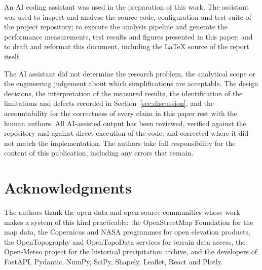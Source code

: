 \documentclass[sigconf,review,10pt]{acmart}
\begin{document}
An AI coding assistant was used in the preparation of this work. The
assistant was used to inspect and analyse the source code, configuration
and test suite of the project repository; to execute the analysis pipeline
and generate the performance measurements, test results and figures
presented in this paper; and to draft and reformat this document,
including the LaTeX source of the report itself.

The AI assistant did not determine the research problem, the analytical
scope or the engineering judgement about which simplifications are
acceptable. The design decisions, the interpretation of the measured
results, the identification of the limitations and defects recorded in
Section~\ref{sec:discussion}, and the accountability for the correctness
of every claim in this paper rest with the human authors. All
AI-assisted output has been reviewed, verified against the repository and
against direct execution of the code, and corrected where it did not
match the implementation. The authors take full responsibility for the
content of this publication, including any errors that remain.

\section*{Acknowledgments}

The authors thank the open data and open source communities whose work
makes a system of this kind practicable: the OpenStreetMap Foundation for
the map data, the Copernicus and NASA programmes for open elevation
products, the OpenTopography and OpenTopoData services for terrain data
access, the Open-Meteo project for the historical precipitation archive,
and the developers of FastAPI, Pydantic, NumPy, SciPy, Shapely, Leaflet,
React and Plotly.

\balance
\end{document}
